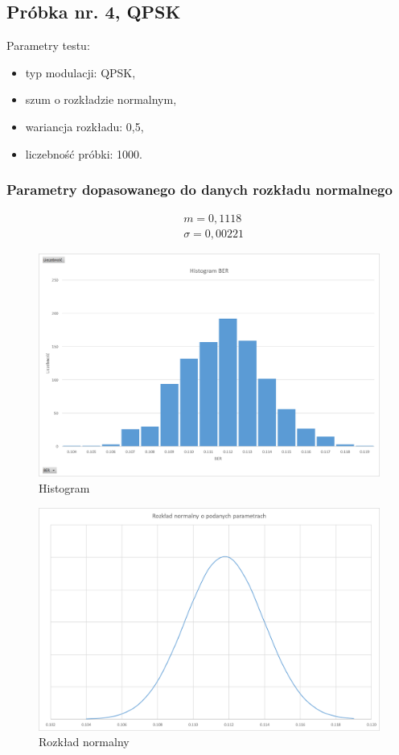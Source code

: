 \documentclass{article}
\begin{document}
	\newpage
	\subsection{Próbka nr. 4, QPSK}
		Parametry testu:
		\begin{itemize}
			\item typ modulacji: QPSK,
			\item szum o rozkładzie normalnym,
			\item wariancja rozkładu: 0,5,
			\item liczebność próbki: 1000.
		\end{itemize}
		
		\subsubsection{Parametry dopasowanego do danych rozkładu normalnego}
			\begin{align*}
				&m = 0,1118\\
				&\sigma = 0,00221
			\end{align*}
		
			\begin{figure}[H]
				\centering
				\includegraphics[width=0.8\linewidth]{img/hist_qpsk05.png}
				\caption{Histogram}
			\end{figure}
			\begin{figure}[H]
				\centering
				\includegraphics[width=0.8\linewidth]{img/rozk_qpsk05.png}
				\caption{Rozkład normalny}
			\end{figure}
		
\end{document}
